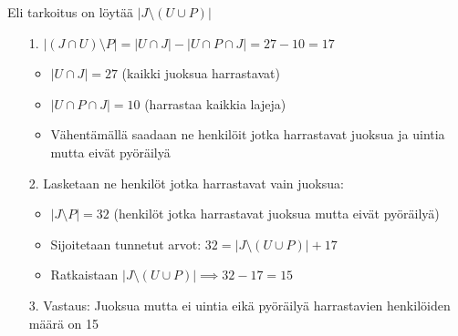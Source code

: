 \documentclass{article}
\begin{document}
\begin{itemize}
      Eli tarkoitus on löytää $|J \setminus (U \cup P)|$
      \begin{itemize}
        \item[1.] $|(J \cap U) \setminus P| = |U \cap J| - |U \cap P \cap J| = 27 - 10 = 17$
        \begin{itemize}
            \item $|U \cap J| = 27$ (kaikki juoksua harrastavat)
            \item $|U \cap P \cap J| = 10$ (harrastaa kaikkia lajeja)
            \item Vähentämällä saadaan ne henkilöit jotka harrastavat juoksua ja uintia mutta eivät pyöräilyä
        \end{itemize}
        \item[2.]Lasketaan ne henkilöt jotka harrastavat vain juoksua:
        \begin{itemize}
            \item $|J \setminus P| = 32$ (henkilöt jotka harrastavat juoksua mutta eivät pyöräilyä)
            \item Sijoitetaan tunnetut arvot: $32 = |J \setminus (U \cup P)| + 17$
            \item Ratkaistaan $|J \setminus (U \cup P)| \implies 32 - 17 = 15$
        \end{itemize}
        \item[3.]Vastaus:
        Juoksua mutta ei uintia eikä pyöräilyä harrastavien henkilöiden määrä on 15
      \end{itemize}
      


\end{itemize}
\end{document}
